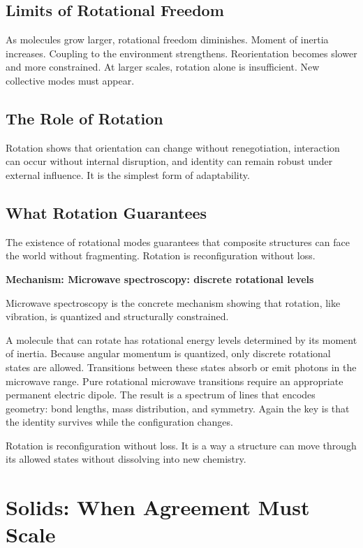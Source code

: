 \documentclass[11pt,twoside,openright]{book}
\newenvironment{mechanismbox}[1]
  {\begin{framed}\noindent\textbf{Mechanism: #1}\par\medskip}
  {\end{framed}}
\begin{document}
\section*{Limits of Rotational Freedom}

As molecules grow larger, rotational freedom diminishes. Moment of inertia increases. Coupling to the environment strengthens. Reorientation becomes slower and more constrained. At larger scales, rotation alone is insufficient. New collective modes must appear.

\section*{The Role of Rotation}

Rotation shows that orientation can change without renegotiation, interaction can occur without internal disruption, and identity can remain robust under external influence. It is the simplest form of adaptability.

\section*{What Rotation Guarantees}

The existence of rotational modes guarantees that composite structures can face the world without fragmenting. Rotation is reconfiguration without loss.

\begin{mechanismbox}{Microwave spectroscopy: discrete rotational levels}
Microwave spectroscopy is the concrete mechanism showing that rotation, like vibration, is quantized and structurally constrained.

A molecule that can rotate has rotational energy levels determined by its moment of inertia. Because angular momentum is quantized, only discrete rotational states are allowed. Transitions between these states absorb or emit photons in the microwave range. Pure rotational microwave transitions require an appropriate permanent electric dipole. The result is a spectrum of lines that encodes geometry: bond lengths, mass distribution, and symmetry. Again the key is that the identity survives while the configuration changes.

Rotation is reconfiguration without loss.
It is a way a structure can move through its allowed states without dissolving into new chemistry.
\end{mechanismbox}
\chapter{Solids: When Agreement Must Scale}
\end{document}
